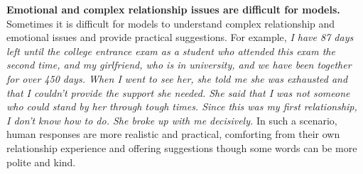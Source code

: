 \textbf{Emotional and complex relationship issues are difficult for models.}
Sometimes it is difficult for models to understand complex relationship and emotional issues and provide practical suggestions.
For example, \textit{I have 87 days left until the college entrance exam as a student who attended this exam the second time, and my girlfriend, who is in university, and we have been together for over 450 days. When I went to see her, she told me she was exhausted and that I couldn't provide the support she needed. She said that I was not someone who could stand by her through tough times. Since this was my first relationship, I don't know how to do. She broke up with me decisively.}
In such a scenario, human responses are more realistic and practical, comforting from their own relationship experience and offering suggestions though some words can be more polite and kind.


